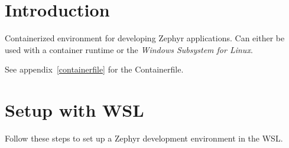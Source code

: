



\puttitle{}

\section{Introduction}

Containerized environment for developing Zephyr applications. Can either be
used with a container runtime or the \emph{Windows Subsystem for Linux}.

See appendix~\ref{containerfile} for the Containerfile.

\newpage

\section{Setup with WSL}

Follow these steps to set up a Zephyr development environment in the WSL.

